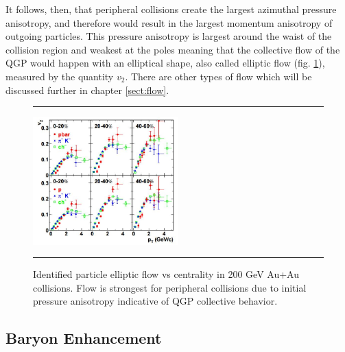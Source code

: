 It follows, then, that peripheral collisions create the largest azimuthal pressure anisotropy, and therefore would result in the largest momentum anisotropy of outgoing particles. This pressure anisotropy is largest around the waist of the collision region and weakest at the poles meaning that the collective flow of the QGP would happen with an elliptical shape, also called elliptic flow (fig. \ref{fig:v2auau}), measured by the quantity $v_2$. There are other types of flow which will be discussed further in chapter \ref{sect:flow}.
    
\begin{figure}[htbp]
\centering 	\rule{35em}{0.5pt}
    \includegraphics[width=0.5\textwidth]{prevplots/v2auau.jpg}

	\caption[Identified particle elliptic flow vs centrality in 200 GeV Au+Au collisions]{Identified particle elliptic flow vs centrality in 200 GeV Au+Au collisions. Flow is strongest for peripheral collisions due to initial pressure anisotropy indicative of QGP collective behavior. \citep{Adler:2003kt}}
\label{fig:v2auau}	\rule{35em}{0.5pt}
\end{figure}

\subsection{Baryon Enhancement}

